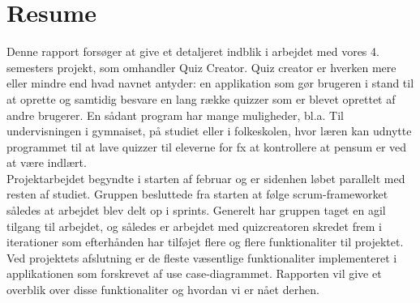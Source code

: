 
\chapter*{Resume}
Denne rapport forsøger at give et detaljeret indblik i arbejdet med vores 4. semesters projekt, som omhandler Quiz Creator. Quiz creator er hverken mere eller mindre end hvad navnet antyder: en applikation som gør brugeren i stand til at oprette og samtidig besvare en lang række quizzer som er blevet oprettet af andre brugerer. En sådant program har mange muligheder, bl.a. Til undervisningen i gymnaiset, på studiet eller i folkeskolen, hvor læren kan udnytte programmet til at lave quizzer til eleverne for fx at kontrollere at pensum er ved at være indlært. \\
Projektarbejdet begyndte i starten af februar og er sidenhen løbet parallelt med resten af studiet. Gruppen besluttede fra starten at følge scrum-frameworket således at arbejdet blev delt op i sprints. Generelt har gruppen taget en agil tilgang til arbejdet, og således er arbejdet med quizcreatoren skredet frem i iterationer som efterhånden har tilføjet flere og flere funktionaliter til projektet. \\
Ved projektets afslutning er de fleste væsentlige funktionaliter implementeret i applikationen som forskrevet af use case-diagrammet. Rapporten vil give et overblik over disse funktionaliter og hvordan vi er nået derhen.
